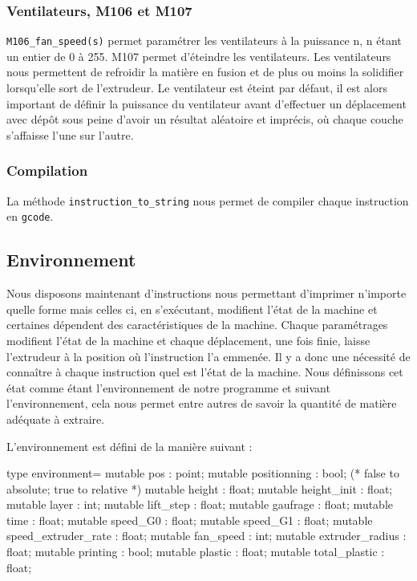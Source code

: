 \documentclass[11pt, titlepage]{article}
\begin{document}
	\subsubsection{Ventilateurs, M106 et M107}
	\verb&M106_fan_speed(s)& permet paramétrer les ventilateurs à la puissance n, n étant un entier de 0 à 255.
M107 permet d'éteindre les ventilateurs.
Les ventilateurs nous permettent de refroidir la matière en fusion et de plus ou moins la solidifier lorsqu'elle sort de l'extrudeur.
Le ventilateur est éteint par défaut, il est alors important de définir la puissance du ventilateur avant d'effectuer un déplacement avec dépôt sous peine d'avoir un résultat aléatoire et imprécis, où chaque couche s'affaisse l'une sur l'autre.
	\subsubsection{Compilation}
	La méthode \verb&instruction_to_string& nous permet de compiler chaque instruction en \verb&gcode&.

\subsection{Environnement}
Nous disposons maintenant d'instructions nous permettant d'imprimer n'importe quelle forme mais celles ci, en s'exécutant, modifient l'état de la machine et certaines dépendent des caractéristiques de la machine. Chaque paramétrages modifient l'état de la machine et chaque déplacement, une fois finie, laisse l'extrudeur à la position où l'instruction l'a emmenée. Il y a donc une nécessité de connaître à chaque instruction quel est l'état de la machine. Nous définissons cet état comme étant l'environnement de notre programme et suivant l'environnement, cela nous permet entre autres de savoir la quantité de matière adéquate à extraire.
\newline

L'environnement est défini de la manière suivant :
\begin{lstisting}
type environment=
  {
    mutable pos : point;
    mutable positionning : bool; (* false to absolute; true to relative *)
    mutable height : float;
    mutable height_init : float;
    mutable layer : int;
    mutable lift_step : float;
    mutable gaufrage : float;
    mutable time : float;
    mutable speed_G0 : float;
    mutable speed_G1 : float;
    mutable speed_extruder_rate : float;
    mutable fan_speed : int;
    mutable extruder_radius : float;
    mutable printing : bool;
    mutable plastic : float;
    mutable total_plastic : float;
  }
\end{lstisting}
\end{document}
